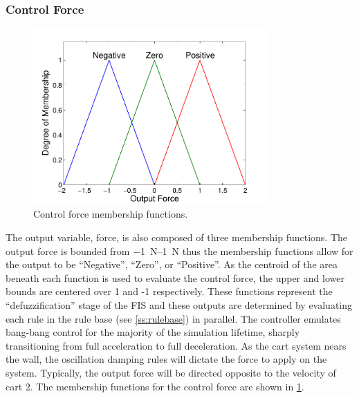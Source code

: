 \subsubsection{Control Force}
\begin{figure}[ht]
    \centering
    \includegraphics[width=0.8\textwidth]{images/f_mfs.pdf}
    \caption{Control force membership functions.}
    \label{f:fmfs}
\end{figure}
The output variable, force, is
also composed of three membership functions. The output force is bounded from \SIrange{-1}{1}{\newton} thus
the membership functions allow for the output to be ``Negative'', ``Zero'', or ``Positive''. As the centroid
of the area beneath each function is used to evaluate the control force, the upper and lower bounds are
centered over 1 and -1 respectively. These functions represent the ``defuzzification'' stage of the FIS and
these outputs are determined by evaluating each rule in the rule base (see \cref{ss:rulebase}) in
parallel\cite{matlab:12tb}. The controller emulates bang-bang control for the majority of the simulation
lifetime, sharply transitioning from full acceleration to full deceleration. As the cart system nears the
wall, the oscillation damping rules will dictate the force to apply on the system. Typically, the output force
will be directed opposite to the velocity of cart 2. The membership functions for the control force are shown
in \cref{f:fmfs}.
	
